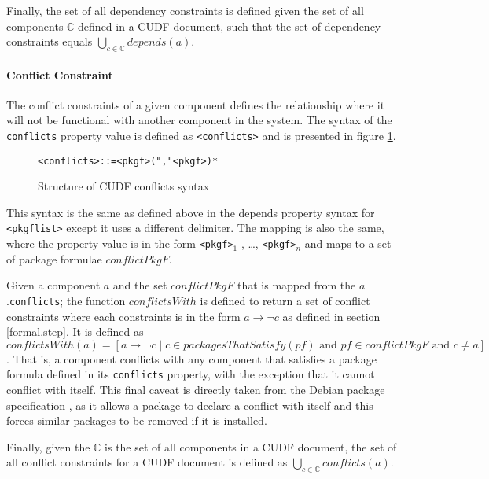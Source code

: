 Finally, the set of all dependency constraints is defined given the set of all components $\mathbb{C}$ defined in a CUDF document,
such that the set of dependency constraints equals $\bigcup \limits_{c\in \mathbb{C}} depends(a)$.

\paragraph{Conflict Constraint}
The conflict constraints of a given component defines the relationship where it will not be functional with another component in the system.
The syntax of the \verb+conflicts+ property value is defined as \verb+<conflicts>+ and is presented in figure \ref{formal.cudfconflictsyntax}.

\begin{figure}[htp] 
\begin{center}
\begin{alltt}
<conflicts> ::= <pkgf> ("," <pkgf>)*
\end{alltt}
  \caption[CUDF Package conflicts syntax]{Structure of CUDF conflicts syntax}
  \label{formal.cudfconflictsyntax}
\end{center}
\end{figure}

This syntax is the same as defined above in the depends property syntax for \verb+<pkgflist>+ except it uses a different delimiter. 
The mapping is also the same, where the property value is in the form \verb+<pkgf>+$_1$ , \ldots , \verb+<pkgf>+$_n$ and maps to a set of package formulae $conflictPkgF$.

Given a component $a$ and the set $conflictPkgF$ that is mapped from the $a$.\verb+conflicts+;
the function $conflictsWith$ is defined to return a set of conflict constraints where each constraints is in the form $a \rightarrow \neg c$ as defined in section \ref{formal.step}.
It is defined as $conflictsWith(a) = [a \rightarrow \neg c \mid c \in packagesThatSatisfy(pf) \mbox{ and } pf \in conflictPkgF \mbox { and } c \not = a]$.
That is, a component conflicts with any component that satisfies a package formula defined in its \verb+conflicts+ property,
with the exception that it cannot conflict with itself.
This final caveat is directly taken from the Debian package specification \citep{Barth2005}, as it allows a package to declare a conflict with itself and this forces similar packages to be removed if it is installed.  

Finally, given the $\mathbb{C}$ is the set of all components in a CUDF document,
the set of all conflict constraints for a CUDF document is defined as $\bigcup \limits_{c\in \mathbb{C}} conflicts(a)$.

